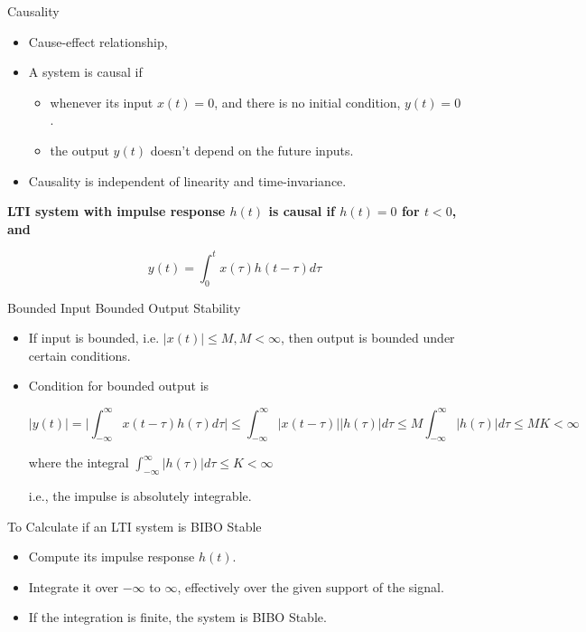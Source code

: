\documentclass[aspectratio=169,xcolor=dvipsnames,svgnames,x11names,fleqn]{beamer}
\begin{document}
\begin{frame}{Causality}
    \begin{itemize}
        \item Cause-effect relationship,
        \item A system is causal if
        \begin{gradred}
            \begin{itemize}
                \item whenever its input $x(t) = 0$, and there is no initial condition, $y(t) = 0$.
                \item the output $y(t)$ doesn't depend on the future inputs.
            \end{itemize}
        \end{gradred}
        \item Causality is independent of linearity and time-invariance.
    \end{itemize}
    \bf LTI system with impulse response $h(t)$ is causal if $h(t) = 0$ for $t < 0$, and 
    \begin{gradblue}
        $$
    y(t) = \int_0^t x(\tau) h(t-\tau)d\tau
    $$
    \end{gradblue}
    
\end{frame}

\begin{frame}{Bounded Input Bounded Output Stability}
\begin{itemize}
    \item If input is bounded, i.e. $ |x(t)| \leq M, M  < \infty$, then output is bounded under certain conditions.
    \item Condition for bounded output is
\begin{gradyellow}
   $$ |y(t)| = \bigg| \int_{-\infty}^\infty x(t-\tau)h(\tau)d\tau \bigg| \leq \int_{-\infty}^\infty|x(t-\tau)| | h(\tau)| d\tau \leq M \int_{-\infty}^\infty |h(\tau)| d\tau \leq MK <\infty $$

   where the integral $\int_{-\infty}^\infty |h(\tau)|d\tau \leq K < \infty$

i.e., the impulse is absolutely integrable.
\end{gradyellow}
\end{itemize}
\end{frame}

\begin{frame}{To Calculate if an LTI system is BIBO Stable}

\Large
    \begin{itemize}
        \item Compute its impulse response $h(t)$.
        \item Integrate it over $-\infty$ to $\infty$, effectively over the given support of the signal.
        \item If the integration is finite, the system is BIBO Stable.
    \end{itemize}
\end{frame}
\end{document}
